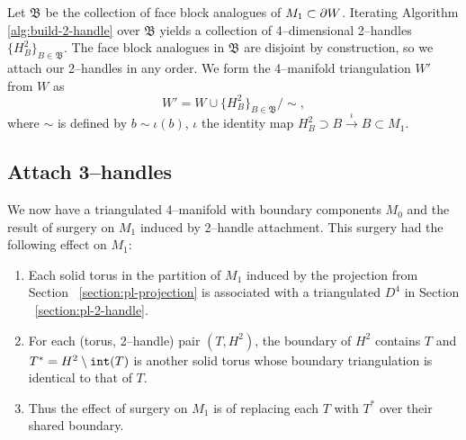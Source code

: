 Let $\mathfrak{B}$ be the collection of face block analogues of $M_1\subset \partial W$.
Iterating Algorithm \ref{alg:build-2-handle} over $\mathfrak{B}$ yields a collection of 4--dimensional 2--handles $\{H_B^2\}_{B\in\mathfrak{B}}$.
The face block analogues in $\mathfrak{B}$ are disjoint by construction, so we attach our 2--handles in any order.
We form the 4--manifold triangulation $W'$ from $W$ as
\[
	W' = W\cup\{H_B^2\}_{B\in\mathfrak{B}}/\sim,
\]
where $\sim$ is defined by $b\sim \iota(b)$, $\iota$ the identity map $H_B^2\supset B\overset{\iota}{\to} B\subset M_1$.


%	


\subsection{Attach 3--handles}

We now have a triangulated 4--manifold with boundary components $M_0$ and the result of surgery on $M_1$ induced by 2--handle attachment.
This surgery had the following effect on $M_1$:
\begin{enumerate}
	\item Each solid torus in the partition of $M_1$ induced by the projection from Section ~\ref{section:pl-projection} is associated with a triangulated $D^4$ in Section ~\ref{section:pl-2-handle}.
	\item For each (torus, 2--handle) pair $(T, H^2)$, the boundary of $H^2$ contains $T$ and $T^* = H^2\setminus \texttt{int}(T)$ is another solid torus whose boundary triangulation is identical to that of $T$.
	\item Thus the effect of surgery on $M_1$ is of replacing each $T$ with $T^*$ over their shared boundary.
\end{enumerate}

